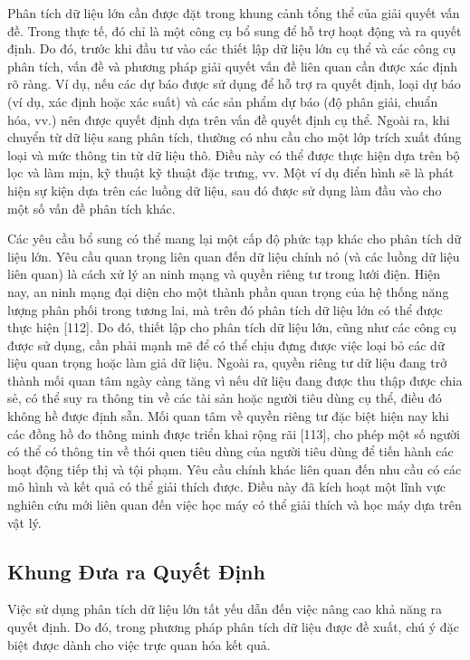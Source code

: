\documentclass[utf8]{frontiersSCNS} %
\begin{document}
Phân tích dữ liệu lớn cần được đặt trong khung cảnh tổng thể của giải quyết vấn đề. Trong thực tế, đó chỉ là một công cụ bổ sung để hỗ trợ hoạt động và ra quyết định. Do đó, trước khi đầu tư vào các thiết lập dữ liệu lớn cụ thể và các công cụ phân tích, vấn đề và phương pháp giải quyết vấn đề liên quan cần được xác định rõ ràng. Ví dụ, nếu các dự báo được sử dụng để hỗ trợ ra quyết định, loại dự báo (ví dụ, xác định hoặc xác suất) và các sản phẩm dự báo (độ phân giải, chuẩn hóa, vv.) nên được quyết định dựa trên vấn đề quyết định cụ thể. Ngoài ra, khi chuyển từ dữ liệu sang phân tích, thường có nhu cầu cho một lớp trích xuất đúng loại và mức thông tin từ dữ liệu thô. Điều này có thể được thực hiện dựa trên bộ lọc và làm mịn, kỹ thuật kỹ thuật đặc trưng, vv. Một ví dụ điển hình sẽ là phát hiện sự kiện dựa trên các luồng dữ liệu, sau đó được sử dụng làm đầu vào cho một số vấn đề phân tích khác.

Các yêu cầu bổ sung có thể mang lại một cấp độ phức tạp khác cho phân tích dữ liệu lớn. Yêu cầu quan trọng liên quan đến dữ liệu chính nó (và các luồng dữ liệu liên quan) là cách xử lý an ninh mạng và quyền riêng tư trong lưới điện. Hiện nay, an ninh mạng đại diện cho một thành phần quan trọng của hệ thống năng lượng phân phối trong tương lai, mà trên đó phân tích dữ liệu lớn có thể được thực hiện [112]. Do đó, thiết lập cho phân tích dữ liệu lớn, cũng như các công cụ được sử dụng, cần phải mạnh mẽ để có thể chịu đựng được việc loại bỏ các dữ liệu quan trọng hoặc làm giả dữ liệu. Ngoài ra, quyền riêng tư dữ liệu đang trở thành mối quan tâm ngày càng tăng vì nếu dữ liệu đang được thu thập được chia sẻ, có thể suy ra thông tin về các tài sản hoặc người tiêu dùng cụ thể, điều đó không hề được định sẵn. Mối quan tâm về quyền riêng tư đặc biệt hiện nay khi các đồng hồ đo thông minh được triển khai rộng rãi [113], cho phép một số người có thể có thông tin về thói quen tiêu dùng của người tiêu dùng để tiến hành các hoạt động tiếp thị và tội phạm. Yêu cầu chính khác liên quan đến nhu cầu có các mô hình và kết quả có thể giải thích được. Điều này đã kích hoạt một lĩnh vực nghiên cứu mới liên quan đến việc học máy có thể giải thích và học máy dựa trên vật lý.



\subsection{Khung Đưa ra Quyết Định}
Việc sử dụng phân tích dữ liệu lớn tất yếu dẫn đến việc nâng cao khả năng ra quyết định. Do đó, trong phương pháp phân tích dữ liệu được đề xuất, chú ý đặc biệt được dành cho việc trực quan hóa kết quả.
\end{document}
